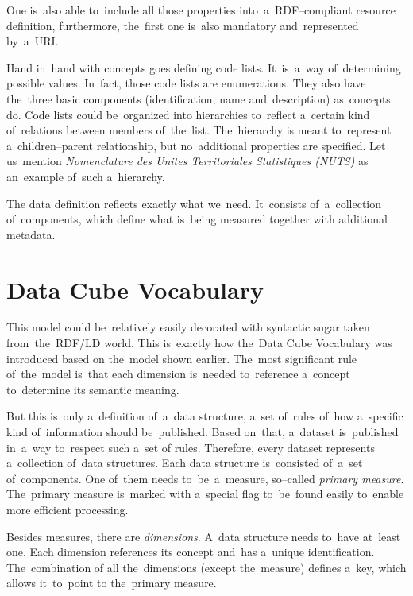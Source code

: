 One is~also able to~include all those properties into~a~RDF--compliant resource definition,
furthermore, the~first one is~also mandatory and~represented by~a~URI.

\label{SDMX-code-lists}
Hand in~hand with concepts goes defining code lists. It~is~a~way of~determining possible
values. In~fact, those code lists are enumerations. They also have the~three basic components
(identification, name and~description) as~concepts do. Code lists could be~organized into
hierarchies to~reflect a~certain kind of~relations between members of~the~list. The~hierarchy
is meant to~represent a~children--parent relationship, but no~additional properties are specified.
Let us~mention \emph{Nomenclature des Unites Territoriales Statistiques (NUTS)} 
as an~example of~such a~hierarchy.

The data definition reflects exactly what we~need. It~consists of~a~collection of~components, which define what is~being measured together with additional metadata.

\section{Data Cube Vocabulary}
\label{datacube-vocabulary}

\begin{sloppypar}
This model could be~relatively easily decorated with syntactic sugar taken from~the~RDF/LD
world. This is~exactly how the~Data Cube Vocabulary was introduced based
on the~model shown earlier. The~most significant rule of~the~model is~that each
dimension is~needed to~reference a~concept to~determine its semantic meaning.
\end{sloppypar}

But this is~only a~definition of~a~data structure, a~set of~rules of~how a~specific kind of~information
should be~published. Based on~that, a~dataset is~published in~a~way to~respect such a~set
of rules. Therefore, every dataset represents a~collection of~data structures. Each data
structure is~consisted of~a~set of~components. One of~them needs to~be~a~measure,
so--called \emph{primary measure}. The~primary measure is~marked with a~special flag to~be~found
easily to~enable more efficient processing.

Besides measures, there are \emph{dimensions}. A~data structure needs to~have at~least one.
Each dimension references its concept and~has a~unique identification. The~combination of
all the~dimensions (except the~measure) defines a~key, which allows it~to~point
to the~primary measure.

